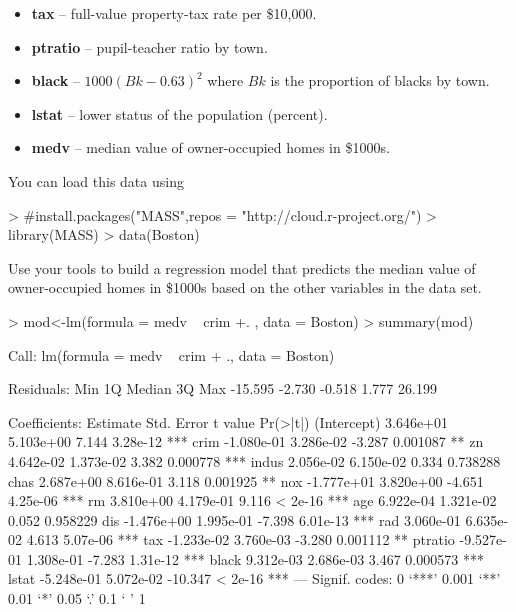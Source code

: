 \documentclass{article}
\begin{document}
\begin{enumerate}
\begin{itemize}
    \item \textbf{tax} -- full-value property-tax rate per \$10,000.
    \item \textbf{ptratio} -- pupil-teacher ratio by town.
    \item \textbf{black} -- $1000(Bk - 0.63)^2$ where $Bk$ is the proportion of blacks by town.
    \item \textbf{lstat} -- lower status of the population (percent).
    \item \textbf{medv} -- median value of owner-occupied homes in \$1000s.
  \end{itemize}
  You can load this data using
\begin{Schunk}
\begin{Sinput}
> #install.packages("MASS",repos = "http://cloud.r-project.org/")
> library(MASS)
> data(Boston)
\end{Sinput}
\end{Schunk}
  Use your tools to build a regression model that predicts the median value of owner-occupied homes
  in \$1000s based on the other variables in the data set.
  
\begin{Schunk}
\begin{Sinput}
> mod<-lm(formula = medv ~ crim +. , data = Boston)
> summary(mod)
\end{Sinput}
\begin{Soutput}
Call:
lm(formula = medv ~ crim + ., data = Boston)

Residuals:
    Min      1Q  Median      3Q     Max 
-15.595  -2.730  -0.518   1.777  26.199 

Coefficients:
              Estimate Std. Error t value Pr(>|t|)    
(Intercept)  3.646e+01  5.103e+00   7.144 3.28e-12 ***
crim        -1.080e-01  3.286e-02  -3.287 0.001087 ** 
zn           4.642e-02  1.373e-02   3.382 0.000778 ***
indus        2.056e-02  6.150e-02   0.334 0.738288    
chas         2.687e+00  8.616e-01   3.118 0.001925 ** 
nox         -1.777e+01  3.820e+00  -4.651 4.25e-06 ***
rm           3.810e+00  4.179e-01   9.116  < 2e-16 ***
age          6.922e-04  1.321e-02   0.052 0.958229    
dis         -1.476e+00  1.995e-01  -7.398 6.01e-13 ***
rad          3.060e-01  6.635e-02   4.613 5.07e-06 ***
tax         -1.233e-02  3.760e-03  -3.280 0.001112 ** 
ptratio     -9.527e-01  1.308e-01  -7.283 1.31e-12 ***
black        9.312e-03  2.686e-03   3.467 0.000573 ***
lstat       -5.248e-01  5.072e-02 -10.347  < 2e-16 ***
---
Signif. codes:  0 ‘***’ 0.001 ‘**’ 0.01 ‘*’ 0.05 ‘.’ 0.1 ‘ ’ 1


\end{Soutput}
\end{Schunk}
\end{enumerate}
\end{document}
